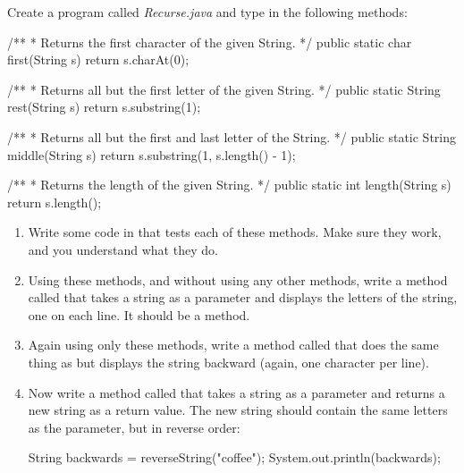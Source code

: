 \begin{exercise}  %

Create a program called {\it Recurse.java} and type in the following methods:

\begin{code}
/**
 * Returns the first character of the given String.
 */
public static char first(String s) {
    return s.charAt(0);
}
\end{code}

\begin{code}
/**
 * Returns all but the first letter of the given String.
 */
public static String rest(String s) {
    return s.substring(1);
}
\end{code}

\begin{code}
/**
 * Returns all but the first and last letter of the String.
 */
public static String middle(String s) {
    return s.substring(1, s.length() - 1);
}
\end{code}

\begin{code}
/**
 * Returns the length of the given String.
 */
public static int length(String s) {
    return s.length();
}
\end{code}

\newpage
\begin{enumerate}

\item Write some code in  that tests each of these methods.
Make sure they work, and you understand what they do.

\item Using these methods, and without using any other  methods, write a method called  that takes a string as a parameter and displays the letters of the string, one on each line.
It should be a  method.

\item Again using only these methods, write a method called  that does the same thing as  but displays the string backward (again, one character per line).

\item Now write a method called  that takes a string as a parameter and returns a new string as a return value.
The new string should contain the same letters as the parameter, but in reverse order:

\begin{code}
String backwards = reverseString("coffee");
System.out.println(backwards);
\end{code}


\end{enumerate}
\end{exercise}
